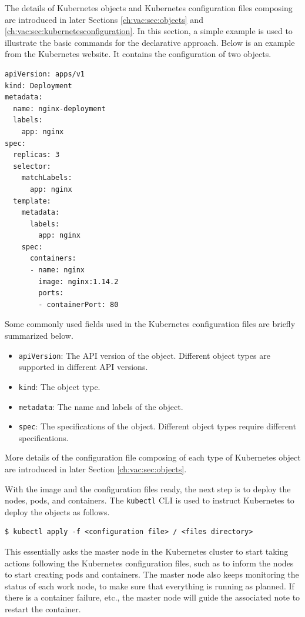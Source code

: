 The details of Kubernetes objects and Kubernetes configuration files composing are introduced in later Sections \ref{ch:vac:sec:objects} and \ref{ch:vac:sec:kubernetesconfiguration}. In this section, a simple example is used to illustrate the basic commands for the declarative approach. Below is an example from the Kubernetes website. It contains the configuration of two objects.
\begin{lstlisting}
apiVersion: apps/v1
kind: Deployment
metadata:
  name: nginx-deployment
  labels:
    app: nginx
spec:
  replicas: 3
  selector:
    matchLabels:
      app: nginx
  template:
    metadata:
      labels:
        app: nginx
    spec:
      containers:
      - name: nginx
        image: nginx:1.14.2
        ports:
        - containerPort: 80
\end{lstlisting}

Some commonly used fields used in the Kubernetes configuration files are briefly summarized below.
\begin{itemize}
	\item \verb|apiVersion|: The API version of the object. Different object types are supported in different API versions.
	\item \verb|kind|: The object type.
	\item \verb|metadata|: The name and labels of the object. 
	\item \verb|spec|: The specifications of the object. Different object types require different specifications.
\end{itemize}
More details of the configuration file composing of each type of Kubernetes object are introduced in later Section \ref{ch:vac:sec:objects}. 

With the image and the configuration files ready, the next step is to deploy the nodes, pods, and containers. The \verb|kubectl| CLI is used to instruct Kubernetes to deploy the objects as follows.
\begin{lstlisting}
$ kubectl apply -f <configuration file> / <files directory>
\end{lstlisting}
This essentially asks the master node in the Kubernetes cluster to start taking actions following the Kubernetes configuration files, such as to inform the nodes to start creating pods and containers. The master node also keeps monitoring the status of each work node, to make sure that everything is running as planned. If there is a container failure, etc., the master node will guide the associated note to restart the container.

